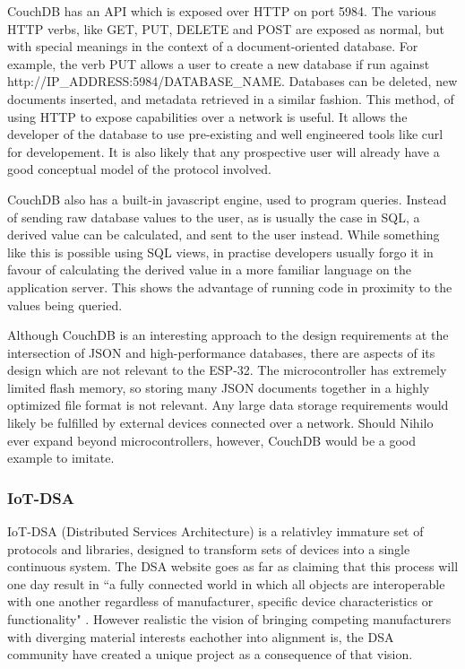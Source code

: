 \documentclass{article}
\begin{document}
CouchDB has an API which is exposed over HTTP on port 5984. The various HTTP verbs, like GET, PUT, DELETE and POST are exposed as normal, but with special meanings in the context of a document-oriented database. For example, the verb PUT allows a user to create a new database if run against http://IP\_ADDRESS:5984/DATABASE\_NAME. Databases can be deleted, new documents inserted, and metadata retrieved in a similar fashion. This method, of using HTTP to expose capabilities over a network is useful. It allows the developer of the database to use pre-existing and well engineered tools like curl for developement. It is also likely that any prospective user will already have a good conceptual model of the protocol involved.

CouchDB also has a built-in javascript engine, used to program queries. Instead of sending raw database values to the user, as is usually the case in SQL, a derived value can be calculated, and sent to the user instead. While something like this is possible using SQL views, in practise developers usually forgo it in favour of calculating the derived value in a more familiar language on the application server. This shows the advantage of running code in proximity to the values being queried.

Although CouchDB is an interesting approach to the design requirements at the intersection of JSON and high-performance databases, there are aspects of its design which are not relevant to the ESP-32. The microcontroller has extremely limited flash memory, so storing many JSON documents together in a highly optimized file format is not relevant. Any large data storage requirements would likely be fulfilled by external devices connected over a network. Should Nihilo ever expand beyond microcontrollers, however, CouchDB would be a good example to imitate.

\subsubsection{IoT-DSA}

IoT-DSA (Distributed Services Architecture) is a relativley immature set of protocols and libraries,  designed to transform sets of devices into a single continuous system. The DSA website goes as far as claiming that this process will one day result in ``a fully connected world in which all objects are interoperable with one another regardless of manufacturer, specific device characteristics or functionality" \cite{dsa}. However realistic the vision of bringing competing manufacturers with diverging material interests eachother into alignment is, the DSA community have created a unique project as a consequence of that vision.
\end{document}
